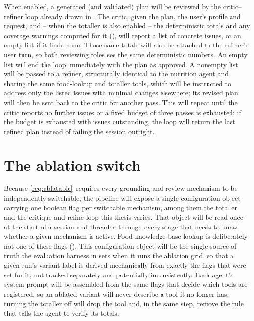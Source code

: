 When enabled, a generated (and validated) plan will be reviewed by the critic--refiner loop already drawn in . The critic, given the plan, the user's profile and request, and -- when the totaller is also enabled -- the deterministic totals and any coverage warnings computed for it (), will report a list of concrete issues, or an empty list if it finds none. Those same totals will also be attached to the refiner's user turn, so both reviewing roles see the same deterministic numbers. An empty list will end the loop immediately with the plan as approved. A nonempty list will be passed to a refiner, structurally identical to the nutrition agent and sharing the same food-lookup and totaller tools, which will be instructed to address only the listed issues with minimal changes elsewhere; its revised plan will then be sent back to the critic for another pass. This will repeat until the critic reports no further issues or a fixed budget of three passes is exhausted; if the budget is exhausted with issues outstanding, the loop will return the last refined plan instead of failing the session outright.

\section{The ablation switch}
\label{sec:design-variant-config}

Because \ref{req:ablatable}~requires every grounding and review mechanism to be independently switchable, the pipeline will expose a single configuration object carrying one boolean flag per switchable mechanism, among them the totaller and the critique-and-refine loop this thesis varies. That object will be read once at the start of a session and threaded through every stage that needs to know whether a given mechanism is active. Food knowledge base lookup is deliberately not one of these flags (). This configuration object will be the single source of truth the evaluation harness in  sets when it runs the ablation grid, so that a given run's variant label is derived mechanically from exactly the flags that were set for it, not tracked separately and potentially inconsistently. Each agent's system prompt will be assembled from the same flags that decide which tools are registered, so an ablated variant will never describe a tool it no longer has: turning the totaller off will drop the tool and, in the same step, remove the rule that tells the agent to verify its totals.

